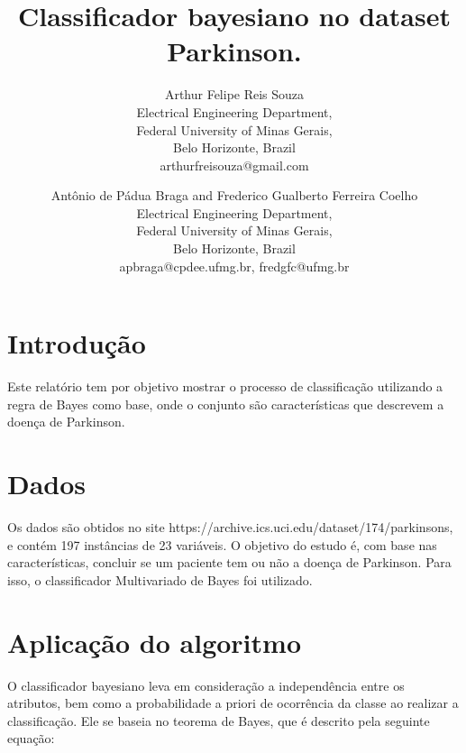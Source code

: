 \documentclass{article}
\begin{document}
\title{Classificador bayesiano no dataset Parkinson.}

\author{Arthur Felipe Reis Souza \\
Electrical Engineering Department, \\
Federal University of Minas Gerais, \\
Belo Horizonte, Brazil \\
arthurfreisouza@gmail.com \\
\and
Antônio de Pádua Braga and Frederico Gualberto Ferreira Coelho \\
Electrical Engineering Department, \\
Federal University of Minas Gerais, \\
Belo Horizonte, Brazil \\
apbraga@cpdee.ufmg.br, fredgfc@ufmg.br
}

\maketitle

\begin{abstract}
\end{abstract}

\section{Introdução}

Este relatório tem por objetivo mostrar o processo de classificação utilizando a regra de Bayes como base, onde o conjunto são características que descrevem a doença de Parkinson.

\section{Dados}

Os dados são obtidos no site https://archive.ics.uci.edu/dataset/174/parkinsons, e contém 197 instâncias de 23 variáveis. O objetivo do estudo é, com base nas características, concluir se um paciente tem ou não a doença de Parkinson. Para isso, o classificador Multivariado de Bayes foi utilizado.

 \section{Aplicação do algoritmo}

 O classificador bayesiano leva em consideração a independência entre os atributos, bem como a probabilidade a priori de ocorrência da classe ao realizar a classificação. Ele se baseia no teorema de Bayes, que é descrito pela seguinte equação:
 
\end{document}

